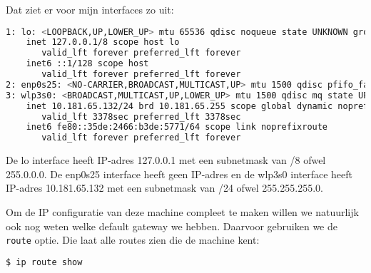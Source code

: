 Dat ziet er voor mijn interfaces zo uit:
\begin{lstlisting}[language=bash]
1: lo: <LOOPBACK,UP,LOWER_UP> mtu 65536 qdisc noqueue state UNKNOWN group default qlen 1000 link/loopback 00:00:00:00:00:00 brd 00:00:00:00:00:00
    inet 127.0.0.1/8 scope host lo
       valid_lft forever preferred_lft forever
    inet6 ::1/128 scope host
       valid_lft forever preferred_lft forever
2: enp0s25: <NO-CARRIER,BROADCAST,MULTICAST,UP> mtu 1500 qdisc pfifo_fast state DOWN group default qlen 1000 link/ether 54:ee:75:9c:ab:53 brd ff:ff:ff:ff:ff:ff
3: wlp3s0: <BROADCAST,MULTICAST,UP,LOWER_UP> mtu 1500 qdisc mq state UP group default qlen 1000 link/ether a8:a7:95:91:2d:8b brd ff:ff:ff:ff:ff:ff
    inet 10.181.65.132/24 brd 10.181.65.255 scope global dynamic noprefixroute wlp3s0
       valid_lft 3378sec preferred_lft 3378sec
    inet6 fe80::35de:2466:b3de:5771/64 scope link noprefixroute
       valid_lft forever preferred_lft forever
\end{lstlisting}
De lo interface heeft IP-adres 127.0.0.1 met een subnetmask van /8 ofwel 255.0.0.0. De enp0s25 interface heeft geen IP-adres en de wlp3s0 interface heeft IP-adres 10.181.65.132 met een subnetmask van /24 ofwel 255.255.255.0.

Om de IP configuratie van deze machine compleet te maken willen we natuurlijk ook nog weten welke default gateway we hebben. Daarvoor gebruiken we de \texttt{route} optie. Die laat alle routes zien die de machine kent:

\begin{lstlisting}[language=bash]
$ ip route show
\end{lstlisting}

